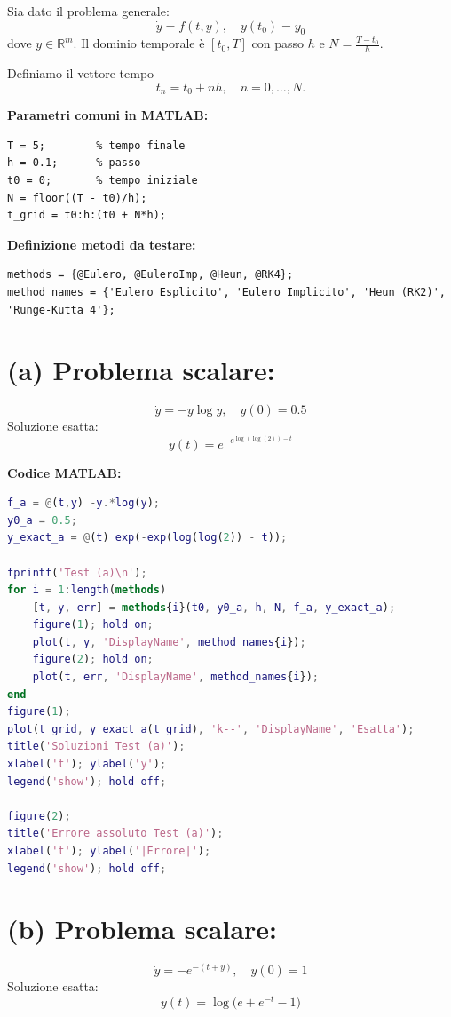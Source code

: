 \documentclass[12pt,a4paper]{article}
\begin{document}
Sia dato il problema generale:  
\[
\dot{y} = f(t,y), \quad y(t_0) = y_0
\]
dove \(y \in \mathbb{R}^m\).  
Il dominio temporale è \([t_0, T]\) con passo \(h\) e \(N = \frac{T - t_0}{h}\).

Definiamo il vettore tempo  
\[
t_n = t_0 + n h, \quad n = 0, \ldots, N.
\]

\vspace{1em}

\noindent
\textbf{Parametri comuni in MATLAB:}
\begin{lstlisting}
T = 5;        % tempo finale
h = 0.1;      % passo
t0 = 0;       % tempo iniziale
N = floor((T - t0)/h);
t_grid = t0:h:(t0 + N*h);
\end{lstlisting}

\vspace{1em}

\noindent
\textbf{Definizione metodi da testare:}
\begin{lstlisting}
methods = {@Eulero, @EuleroImp, @Heun, @RK4};
method_names = {'Eulero Esplicito', 'Eulero Implicito', 'Heun (RK2)', 'Runge-Kutta 4'};
\end{lstlisting}

\section*{(a) Problema scalare:}  
\[
\dot{y} = - y \log y, \quad y(0) = 0.5
\]
Soluzione esatta:  
\[
y(t) = e^{-e^{\log(\log(2)) - t}}
\]

\noindent
\textbf{Codice MATLAB:}
\begin{lstlisting}[language=Matlab]
f_a = @(t,y) -y.*log(y);
y0_a = 0.5;
y_exact_a = @(t) exp(-exp(log(log(2)) - t));

fprintf('Test (a)\n');
for i = 1:length(methods)
    [t, y, err] = methods{i}(t0, y0_a, h, N, f_a, y_exact_a);
    figure(1); hold on;
    plot(t, y, 'DisplayName', method_names{i});
    figure(2); hold on;
    plot(t, err, 'DisplayName', method_names{i});
end
figure(1);
plot(t_grid, y_exact_a(t_grid), 'k--', 'DisplayName', 'Esatta');
title('Soluzioni Test (a)');
xlabel('t'); ylabel('y');
legend('show'); hold off;

figure(2);
title('Errore assoluto Test (a)');
xlabel('t'); ylabel('|Errore|');
legend('show'); hold off;
\end{lstlisting}

\vspace{2em}

\section*{(b) Problema scalare:}  
\[
\dot{y} = - e^{-(t + y)}, \quad y(0) = 1
\]
Soluzione esatta:  
\[
y(t) = \log\bigl(e + e^{-t} - 1\bigr)
\]
\end{document}
